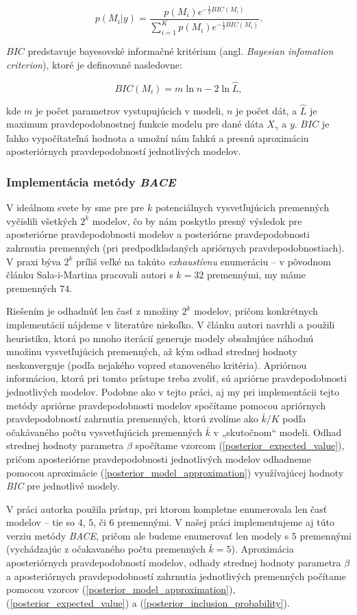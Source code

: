 \begin{equation} \label{posterior_model_approximation}
        p(M_i | y) = \frac{p(M_i) e^{-\frac{1}{2}BIC(M_i)}}{\sum_{i = 1}^{K} p(M_i) e^{-\frac{1}{2}BIC(M_i)}}.
\end{equation}

\(BIC\) predstavuje bayesovské informačné kritérium (angl. \emph{Bayesian infomation criterion}), ktoré je definované nasledovne:

\[
    BIC(M_i) = m \ln{n} - 2 \ln{\hat{L}},
\]

kde \( m \) je počet parametrov vystupujúcich v modeli, \(n\) je počet dát,
a \(\hat{L}\) je maximum pravdepodobnostnej funkcie modelu pre dané dáta \(X_{\gamma}\) a \(y\).
\(BIC\) je ľahko vypočítateľná hodnota a umožní nám ľahkú a presnú aproximáciu aposteriórnych pravdepodobností jednotlivých modelov.

\subsubsection{Implementácia metódy \emph{BACE}}

V ideálnom svete by sme pre pre \(k\) potenciálnych vysvetľujúcich premenných vyčíslili všetkých \(2^k\) modelov,
čo by nám poskytlo presný výsledok pre aposteriórne pravdepodobnosti modelov a posteriórne pravdepodobnosti zahrnutia premenných (pri predpodkladaných apriórnych pravdepodobnostiach).
V praxi býva \(2^k\) príliš veľké na takúto \emph{exhaustívnu} enumeráciu – v pôvodnom článku Sala-i-Martina pracovali autori s \(k = 32\) premennými, my máme premenných \(74\).

Riešením je odhadnúť len časť z množiny \(2^k\) modelov, pričom konkrétnych implementácií nájdeme v literatúre niekoľko.
V článku \cite{sala-i-martin} autori navrhli a použili heuristiku, ktorá po mnoho iterácií generuje modely obsahujúce náhodnú množinu vysvetľujúcich premenných,
až kým odhad strednej hodnoty neskonverguje (podľa nejakého vopred stanoveného kritéria).
Apriórnou informáciou, ktorú pri tomto prístupe treba zvoliť, sú apriórne pravdepodobnosti jednotlivých modelov.
Podobne ako v tejto práci, aj my pri implementácii tejto metódy apriórne pravdepodobnosti modelov spočítame pomocou apriórnych pravdepodobností zahrnutia premenných,
ktorú zvolíme ako \(\bar{k}/K\) podľa očakávaného počtu vysvetľujúcich premenných \(\bar{k}\) v „skutočnom“ modeli.
Odhad strednej hodnoty parametra \(\beta\) spočítame vzorcom (\ref{posterior_expected_value}),
pričom aposteriórne pravdepodobnosti jednotlivých modelov odhadneme pomocou aproximácie (\ref{posterior_model_approximation}) využívajúcej hodnoty \emph{BIC} pre jednotlivé modely.

V práci \cite{ondrusekova} autorka použila prístup, pri ktorom kompletne enumerovala len časť modelov – tie so \(4\), \(5\), či \(6\) premennými.
V našej práci implementujeme aj túto verziu metódy \emph{BACE}, pričom ale budeme enumerovať len modely s \(5\) premennými (vychádzajúc z očakavaného počtu premenných \(\bar{k} = 5\)).
Aproximácia aposteriórnych pravdepodobností modelov, odhady strednej hodnoty parametra \(\beta\) a aposteriórnych pravdepodobností zahrnutia jednotlivých premenných počítame pomocou vzorcov
(\ref{posterior_model_approximation}), (\ref{posterior_expected_value}) a (\ref{posterior_inclusion_probability}).